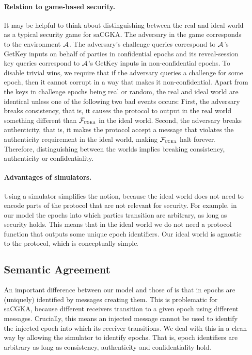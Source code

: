 \paragraph{Relation to game-based security.}
It may be helpful to think about distinguishing between the real and ideal world as a typical security game for saCGKA. The adversary in the game corresponds to the environment $\mathcal{A}_{\relax}$. The adversary's challenge queries correspond to $\mathcal{A}_{\relax}$'s GetKey inputs on behalf of parties in confidential epochs and its reveal-session key queries correspond to $\mathcal{A}_{\relax}$'s GetKey inputs in non-confidential epochs. To disable trivial wins, we require that if the adversary queries a challenge for some epoch, then it cannot corrupt in a way that makes it non-confidential.
%
Apart from the keys in challenge epochs being real or random, the real and ideal world are identical unless one of the following two bad events occurs: First, the adversary breaks consistency, that is, it causes the protocol to output in the real world something different than $\mathcal{F}_{\normalfont\textsc{cgka}}$ in the ideal world. Second, the adversary breaks authenticity, that is, it makes the protocol accept a message that violates the authenticity requirement in the ideal world, making $\mathcal{F}_{\normalfont\textsc{cgka}}$ halt forever. Therefore, distinguishing between the worlds implies breaking consistency, authenticity or confidentiality.

\paragraph{Advantages of simulators.}
Using a simulator simplifies the notion, because the ideal world does not
need to encode parts of the protocol that are not relevant for security. For
example, in our model the epochs into which parties transition are arbitrary,
as long as security holds. This means that in the ideal world we do not need
a protocol function that outputs some unique epoch identifiers. Our ideal world is agnostic to the protocol, which is conceptually simple.

\subsection{Semantic Agreement}\label{sec:semantic}
An important difference between our model and those of \cite{TCC:ACJM20,EPRINT:AlwJosMul20,hashimoto2021cmpke} is that in \cite{TCC:ACJM20,EPRINT:AlwJosMul20,hashimoto2021cmpke} epochs are (uniquely) identified by messages creating them. This is problematic for saCGKA, because different receivers transition to a given epoch using different messages. Crucially, this means an injected message cannot be used to identify the injected epoch into which its receiver transitions.
We deal with this in a clean way by allowing the simulator to identify epochs. That is, epoch identifiers are arbitrary as long as consistency, authenticity and confidentiality hold.


